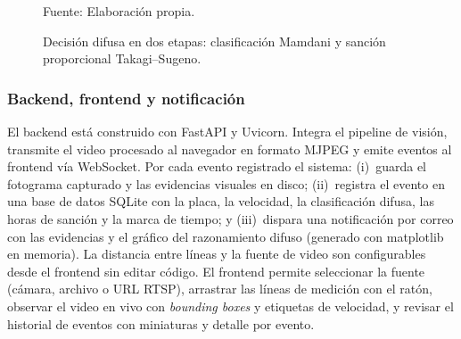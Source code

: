 \documentclass[11pt]{article}
\begin{document}
\begin{figure}[H]
    \centering
    \caption{Decisión difusa en dos etapas: clasificación Mamdani y sanción
    proporcional Takagi--Sugeno.}
    \label{fig:fuzzy}
    \vspace{2pt}
    {\footnotesize Fuente: Elaboración propia.}
\end{figure}

\subsubsection{Backend, frontend y notificación}

El backend está construido con FastAPI y Uvicorn. Integra el pipeline de visión,
transmite el video procesado al navegador en formato MJPEG y emite eventos al frontend
vía WebSocket. Por cada evento registrado el sistema: (i)~guarda el fotograma
capturado y las evidencias visuales en disco; (ii)~registra el evento en una base de
datos SQLite con la placa, la velocidad, la clasificación difusa, las horas de sanción
y la marca de tiempo; y (iii)~dispara una notificación por correo con las evidencias y
el gráfico del razonamiento difuso (generado con matplotlib en memoria). La distancia
entre líneas y la fuente de video son configurables desde el frontend sin editar
código. El frontend permite seleccionar la fuente (cámara, archivo o URL RTSP),
arrastrar las líneas de medición con el ratón, observar el video en vivo con
\emph{bounding boxes} y etiquetas de velocidad, y revisar el historial de eventos con
miniaturas y detalle por evento.
\end{document}
